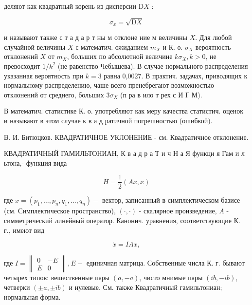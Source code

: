\documentclass[10pt]{article}
\begin{document}
деляют как квадратный корень из дисперсии $\mathrm{D} X$ :



\[

\sigma_{x}=\sqrt{\mathrm{D} X}

\]



и называют также с т а д а р т ны м отклоне ние м величины $X$. Для любой случайной величины $X$ с математич. ожиданием $m_{X}$ и К. о. $\sigma_{X}$ вероятность отклонений $X$ от $m_{X}$, больших по абсолютной величине $k \sigma_{X}, k>0$, не превосходит $1 / k^{2}$ (не равенство Чебышева). В случае нормального распределения указанная вероятность при $k=3$ равна 0,0027. В практич. задачах, приводящих к нормальному распределению, чаше всего пренебрегают возможностью отклонений от среднего, больших $3 \sigma_{X}$ (п ра в ило т рех с И Г М).



В математич. статистике К. о. употребляют как меру качества статистич. оценок и называют в этом случае к в а д ратичной погрешностью (ошибкой).



В. И. Битюцков. КВАДРАТИЧНОЕ УКЛОНЕНИЕ - см. Квадратичное отклонение.



КВАДРАТИЧНЫЙ ГАМИЛЬТОНИАН, К в а д р а Т и ч Н а Я функци я Гам и л ьтона,- функция вида



\[

H=\frac{1}{2}(A x, x)

\]



где $x=\left(p_{1}, \ldots, p_{n}, q_{1}, \ldots, q_{n}\right)-$ вектор, записанный в симплектическом базисе (см. Симплектическое пространство), $(\cdot, \cdot)$ - скалярное произведение, $A$ - симметрический линейный оператор. Канонич. уравнения, соответствующие К. г., имеют вид



\[

\dot{x}=I A x,

\]



где $I=\left\|\begin{array}{cc}0 & -E \\ E & 0\end{array}\right\|, E-$ единичная матрица. Собственные числа К. г. бывают четырех типов: вешественные пары $(a,-a)$, чисто мнимые пары $(i b,-i b)$, четверки $( \pm a, \pm i b)$ и нулевые. См. также Квадратичный гамильтониан; нормальная форма.
\end{document}
